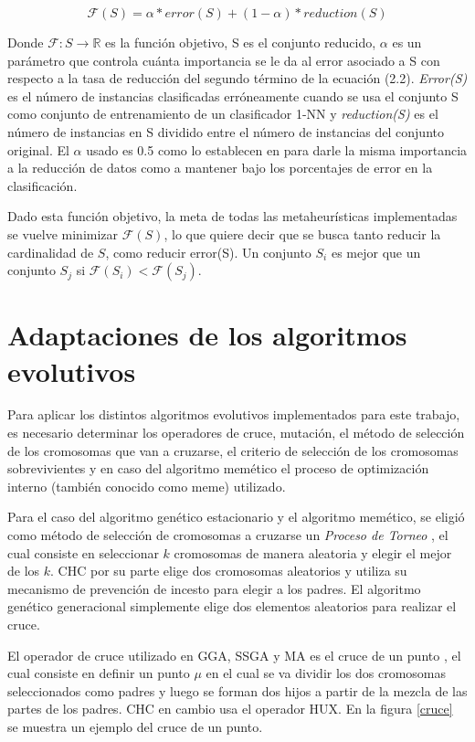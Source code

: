 \begin{equation}
\mathcal{F}(S) = \alpha * error(S) + (1 - \alpha) * reduction(S)
\end{equation} 

Donde $\mathcal{F}: S \rightarrow \mathbb{R}$ es la función objetivo, S es el conjunto reducido, $\alpha$ es un parámetro que controla cuánta importancia se le da al error asociado a S con respecto a la tasa de reducción del segundo término de la ecuación (2.2). \emph{Error(S)} es el número de instancias clasificadas erróneamente cuando se usa el conjunto S como conjunto de entrenamiento de un clasificador 1-NN y \emph{reduction(S)} es el número de instancias en S dividido entre el número de instancias del conjunto original. El $\alpha$ usado es 0.5 como lo establecen en \cite{de2004reduccion} para darle la misma importancia a la reducción de datos como a mantener bajo los porcentajes de error en la clasificación.

Dado esta función objetivo, la meta de todas las metaheurísticas implementadas se vuelve minimizar $\mathcal{F}(S)$, lo que quiere decir que se busca tanto reducir la cardinalidad de $S$, como reducir error(S). Un conjunto $S_i$ es mejor que un conjunto $S_j$ si $\mathcal{F}(S_i) < \mathcal{F}(S_j)$.  

\section{Adaptaciones de los algoritmos evolutivos}

Para aplicar los distintos algoritmos evolutivos implementados para este trabajo, es necesario determinar los operadores de cruce, mutación, el método de selección de los cromosomas que van a cruzarse, el criterio de selección de los cromosomas sobrevivientes y en caso del algoritmo memético el proceso de optimización interno (también conocido como meme) utilizado.

Para el caso del algoritmo genético estacionario y el algoritmo memético, se eligió como método de selección de cromosomas a cruzarse un \emph{Proceso de Torneo} \cite{talbi2009metaheuristics}, el cual consiste en seleccionar $k$ cromosomas de manera aleatoria y elegir el mejor de los $k$. CHC por su parte elige dos cromosomas aleatorios y utiliza su mecanismo de prevención de incesto para elegir a los padres. El algoritmo genético generacional simplemente elige dos elementos aleatorios para realizar el cruce.

El operador de cruce utilizado en GGA, SSGA y MA es el cruce de un punto \cite{talbi2009metaheuristics}, el cual consiste en definir un punto $\mu$ en el cual se va dividir los dos cromosomas seleccionados como padres y luego se forman dos hijos a partir de la mezcla de las partes de los padres. CHC en cambio usa el operador HUX. En la figura \ref{cruce} se muestra un ejemplo del cruce de un punto. 


